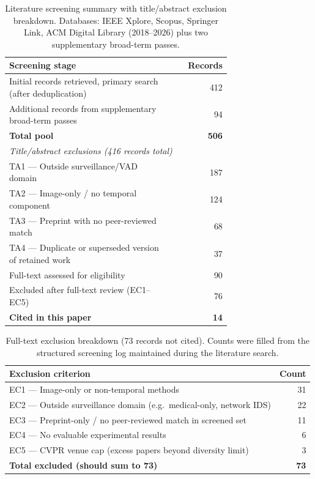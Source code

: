 \documentclass[sensors,article,submit,pdftex,moreauthors]{Definitions/mdpi}
\begin{document}
\begin{table}[H]
\caption{Literature screening summary with title/abstract exclusion breakdown. Databases: IEEE Xplore, Scopus, Springer Link, ACM Digital Library (2018--2026) plus two supplementary broad-term passes.}
\label{tab:prisma}
\centering
\small
\setlength{\tabcolsep}{5pt}
\begin{tabular}{p{0.72\linewidth} r}
\toprule
\textbf{Screening stage} & \textbf{Records} \\
\midrule
Initial records retrieved, primary search (after deduplication) & 412 \\
Additional records from supplementary broad-term passes         & 94  \\
\textbf{Total pool}                                            & \textbf{506} \\
\midrule
\multicolumn{2}{l}{\textit{Title/abstract exclusions (416 records total)}} \\
\quad TA1 --- Outside surveillance/VAD domain                  & 187 \\
\quad TA2 --- Image-only / no temporal component               & 124 \\
\quad TA3 --- Preprint with no peer-reviewed match             & 68  \\
\quad TA4 --- Duplicate or superseded version of retained work & 37  \\
\midrule
Full-text assessed for eligibility                              & 90  \\
Excluded after full-text review (EC1--EC5)                      & 76  \\
\textbf{Cited in this paper}                                   & \textbf{14} \\
\bottomrule
\end{tabular}
\vspace{0.5em}

\end{table}

\begin{table}[H]
\centering
\small
\caption{Full-text exclusion breakdown (73 records not cited). Counts were filled from the structured screening log maintained during the literature search.}
\label{tab:prisma-exclusions}
\begin{tabular}{p{8.2cm} r}
\toprule
\textbf{Exclusion criterion} & \textbf{Count} \\
\midrule
EC1 --- Image-only or non-temporal methods & 31 \\
EC2 --- Outside surveillance domain (e.g.\ medical-only, network IDS) & 22 \\
EC3 --- Preprint-only / no peer-reviewed match in screened set & 11 \\
EC4 --- No evaluable experimental results & 6 \\
EC5 --- CVPR venue cap (excess papers beyond diversity limit) & 3 \\
\midrule
\textbf{Total excluded (should sum to 73)} & \textbf{73} \\
\bottomrule
\end{tabular}
\end{table}
 
\end{document}
